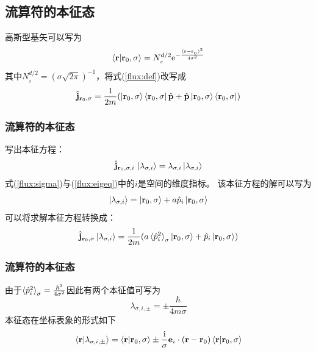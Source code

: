 \documentclass[UTF8]{beamer}
\begin{document}
\subsection{流算符的本征态}
\begin{frame}
    高斯型基矢可以写为
    \begin{equation}
        \braket{\mathbf{r}|\mathbf{r}_0,\sigma}=N_{_\sigma}^{d/2}\mathrm{e}^{-\frac{(\mathbf{r}-\mathbf{r}_{_0})^2}{4\sigma^2}}
    \end{equation}
    其中$N_{_\sigma}^{d/2} = (\sigma\sqrt{2\pi})^{-1}$，将式(\ref{flux:def})改写成
    \begin{equation}
        \hat{\mathbf{j}}_{\mathbf{r}_0,\sigma} = \frac{1}{2m}(\ket{\mathbf{r}_0,\sigma}\bra{\mathbf{r}_0,\sigma}\hat{\mathbf{p}}+\hat{\mathbf{p}}\ket{\mathbf{r}_0,\sigma}\bra{\mathbf{r}_0,\sigma})
        \label{flux:sigma}
    \end{equation}
\end{frame}
\begin{frame}\frametitle{流算符的本征态}
    写出本征方程：
    \begin{equation}
        \hat{\mathbf{j}}_{\mathbf{r}_0,\sigma,i}\,\ket{\lambda_{\sigma,i}}=\lambda_{\sigma,i}\ket{\lambda_{\sigma,i}}
        \label{flux:eigeq}
    \end{equation}
    式(\ref{flux:sigma})与(\ref{flux:eigeq})中的$i$是空间的维度指标。
    该本征方程的解可以写为
    \begin{equation*}
        \ket{\lambda_{\sigma,i}}=\ket{\mathbf{r}_0,\sigma}+a\hat{p}_i\ket{\mathbf{r}_0,\sigma}
    \end{equation*}
    可以将求解本征方程转换成：
    \begin{equation}
        \hat{\mathbf{j}}_{\mathbf{r}_0,\sigma}\ket{\lambda_{\sigma,i}} =
        \frac{1}{2m}(a\braket{\hat{p}_i^2}_{\sigma}\ket{\mathbf{r}_0,\sigma}+\hat{p}_i\ket{\mathbf{r}_0,\sigma})
    \end{equation}
\end{frame}
\begin{frame}\frametitle{流算符的本征态}
    由于$\braket{\hat{p}_i^2}_{\sigma}=\frac{\hbar^2}{4\sigma^2}$因此有两个本征值可写为
    \begin{equation}
        \lambda_{\sigma,i,\pm}=\pm\frac{\hbar}{4m\sigma}
    \end{equation}
    本征态在坐标表象的形式如下
    \begin{equation}
        \braket{\mathbf{r}|\lambda_{\sigma,i,\pm}}=
        \braket{\mathbf{r}|\mathbf{r}_0,\sigma}\pm
        \frac{\mathrm{i}}{\sigma}\mathbf{e}_i\cdot(\mathbf{r}-\mathbf{r}_0)\braket{\mathbf{r}|\mathbf{r}_0,\sigma}
        \label{husimi:eigstate}
    \end{equation}
\end{frame}
\end{document}
